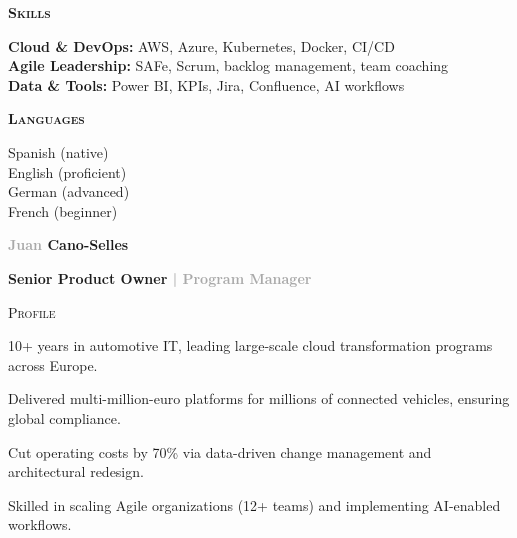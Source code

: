 \documentclass[11pt,a4paper]{article}
\newcommand{\headleft}[1]{\vspace*{2ex}\textsc{\textbf{\color{softwhite}#1}}\par%
  \vspace*{-1.2ex}{\color{softwhite}\hrulefill}\par\vspace*{0.7ex}}
\newcommand{\headright}[1]{\vspace{1.6ex}\textsc{\large\color{cvblue}#1}\par%
  \vspace*{-0.6ex}{\color{cvblue}\hrulefill}\par\vspace*{0.4ex}}
\newlength{\SideBarW}
\begin{document}
\begin{minipage}[t]{\textwidth}
{{\begin{minipage}[t]{\dimexpr\linewidth-8mm\relax}
      \headleft{Skills}
      \textbf{Cloud \& DevOps:} AWS, Azure, Kubernetes, Docker, CI/CD \\[0.6ex]
      \textbf{Agile Leadership:} SAFe, Scrum, backlog management, team coaching \\[0.6ex]
      \textbf{Data \& Tools:} Power BI, KPIs, Jira, Confluence, AI workflows

      \vspace*{3mm} %

      \headleft{Languages}
      Spanish (native) \\[0.4ex]
      English (proficient) \\[0.4ex]
      German (advanced) \\[0.4ex]
      French (beginner)

    \end{minipage}
  }%
}%
\hspace{4mm}%
\begin{minipage}[t]{\dimexpr\textwidth-\SideBarW-4mm\relax}
  \raggedright
  \setlength{\parskip}{0.5ex}

  \vspace*{6mm}
  {\sffont\bfseries\fontsize{50}{52}\selectfont \textcolor{darkgray}{Juan} \textcolor{cvblue}{Cano-Selles}}\par
  \vspace{1.5ex} %
  {\sffont\fontsize{18}{20}\selectfont\bfseries\textcolor{cvblue}{Senior Product Owner} \textcolor{darkgray}{| Program Manager}}\par

  \headright{Profile}
  \vspace*{-1.0ex}
  \begin{list}{\textbullet}{%
      \setlength{\leftmargin}{1.4em}%
      \setlength{\labelsep}{0.5em}%
      \setlength{\itemsep}{0.2ex}%
      \setlength{\topsep}{0.2ex}%
      \setlength{\rightmargin}{6mm}%
      \setlength{\listparindent}{0pt}%
      \setlength{\parsep}{0pt}%
    }
    \item 10+ years in automotive IT, leading large-scale cloud transformation programs across Europe.
    \item Delivered multi-million-euro platforms for millions of connected vehicles, ensuring global compliance.
    \item Cut operating costs by 70\% via data-driven change management and architectural redesign.
    \item Skilled in scaling Agile organizations (12+ teams) and implementing AI-enabled workflows.
  \end{list}


\end{minipage}
\end{minipage}
\end{document}
